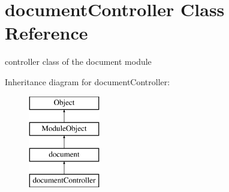 \hypertarget{classdocumentController}{\section{document\+Controller Class Reference}
\label{classdocumentController}
}


controller class of the document module  


Inheritance diagram for document\+Controller\+:\begin{figure}[H]
\begin{center}
\leavevmode
\includegraphics[height=4.000000cm]{classdocumentController}
\end{center}
\end{figure}
